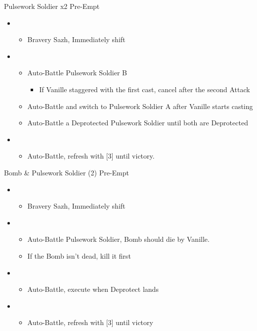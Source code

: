 \begin{multicols}{2}
	\begin{battle}[0:24]{Pulsework Soldier x2 Pre-Empt}
		\begin{itemize}
			\item \second
			      \begin{itemize}
				      \item Bravery Sazh, Immediately shift
			      \end{itemize}
			\item \third
			      \begin{itemize}
				      \item Auto-Battle Pulsework Soldier B
				            \begin{itemize}
					            \item If Vanille staggered with the first cast, cancel after the second Attack
				            \end{itemize}
				      \item Auto-Battle and switch to Pulsework Soldier A after Vanille starts casting
				      \item Auto-Battle a Deprotected Pulsework Soldier until both are Deprotected
			      \end{itemize}
			\item \first
			      \begin{itemize}
				      \item Auto-Battle, refresh with [3] until victory.
			      \end{itemize}
		\end{itemize}
	\end{battle}
	\vfill

	\begin{battle}[0:21]{Bomb \& Pulsework Soldier (2) Pre-Empt}
		\begin{itemize}
			\item \second
			      \begin{itemize}
				      \item Bravery Sazh, Immediately shift
			      \end{itemize}
			\item \first
			      \begin{itemize}
				      \item Auto-Battle Pulsework Soldier, Bomb should die by Vanille.
				      \item If the Bomb isn't dead, kill it first
			      \end{itemize}
			\item \third
			      \begin{itemize}
				      \item Auto-Battle, execute when Deprotect lands
			      \end{itemize}
			\item \first
			      \begin{itemize}
				      \item Auto-Battle, refresh with [3] until victory
			      \end{itemize}
		\end{itemize}
	\end{battle}



\end{multicols}
